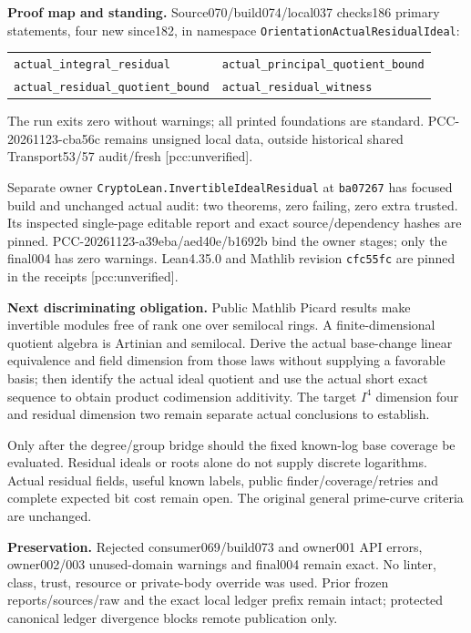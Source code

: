 \documentclass[11pt]{article}
\begin{document}
\textbf{Proof map and standing.}
Source070/build074/local037 checks186 primary statements, four new since182,
in namespace \texttt{OrientationActualResidualIdeal}:
\begin{center}
\begin{tabular}{ll}
\texttt{actual\_integral\_residual}&\texttt{actual\_principal\_quotient\_bound}\\
\texttt{actual\_residual\_quotient\_bound}&\texttt{actual\_residual\_witness}
\end{tabular}
\end{center}
The run exits zero without warnings; all printed foundations are standard.
PCC-20261123-cba56c remains unsigned local data, outside historical shared
Transport53/57 audit/fresh [pcc:unverified].

Separate owner \texttt{CryptoLean.InvertibleIdealResidual} at
\texttt{ba07267} has focused build and unchanged actual audit:
two theorems, zero failing, zero extra trusted.
Its inspected single-page editable report and exact source/dependency hashes
are pinned. PCC-20261123-a39eba/aed40e/b1692b bind the owner stages;
only the final004 has zero warnings. Lean4.35.0 and Mathlib revision
\texttt{cfc55fc} are pinned in the receipts [pcc:unverified].

\textbf{Next discriminating obligation.}
Public Mathlib Picard results make invertible modules free of rank one over
semilocal rings. A finite-dimensional quotient algebra is Artinian and
semilocal. Derive the actual base-change linear equivalence and field dimension
from those laws without supplying a favorable basis; then identify the actual
ideal quotient and use the actual short exact sequence to obtain product
codimension additivity. The target \(I^4\) dimension four and residual dimension
two remain separate actual conclusions to establish.

Only after the degree/group bridge should the fixed known-log base coverage
be evaluated. Residual ideals or roots alone do not supply discrete logarithms.
Actual residual fields, useful known labels, public finder/coverage/retries and
complete expected bit cost remain open. The original general prime-curve
criteria are unchanged.

\textbf{Preservation.}
Rejected consumer069/build073 and owner001 API errors, owner002/003
unused-domain warnings and final004 remain exact. No linter, class, trust,
resource or private-body override was used. Prior frozen reports/sources/raw
and the exact local ledger prefix remain intact; protected canonical ledger
divergence blocks remote publication only.
\end{document}
